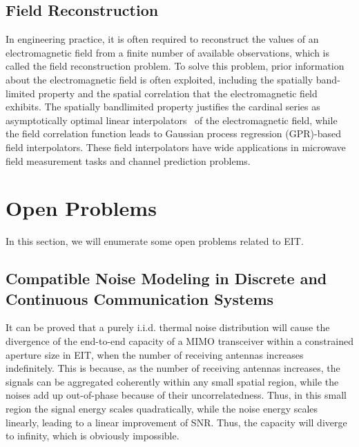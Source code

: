 \documentclass[journal,twocolumn]{IEEEtran}
\begin{document}

\subsection{Field Reconstruction}
In engineering practice, it is often required to reconstruct the values of an electromagnetic field from a finite number of available observations, which is called the field reconstruction problem. 
To solve this problem, prior information about the electromagnetic field is often exploited, including the spatially band-limited property and the spatial correlation that the electromagnetic field exhibits. 
The spatially bandlimited property justifies the cardinal series as asymptotically optimal linear interpolators~\cite{pizzo2022nyquist} of the electromagnetic field, while the field correlation function leads to Gaussian process regression (GPR)-based field interpolators. 
These field interpolators have wide applications in microwave field measurement tasks and channel prediction problems. 

\section{Open Problems}
In this section, we will enumerate some open problems related to EIT. 

\subsection{Compatible Noise Modeling in Discrete and Continuous Communication Systems}
It can be proved that a purely i.i.d. thermal noise distribution will cause the divergence of the end-to-end capacity of a MIMO transceiver within a constrained aperture size in EIT, when the number of receiving antennas increases indefinitely. 
This is because, as the number of receiving antennas increases, the signals can be aggregated coherently within any small spatial region, while the noises add up out-of-phase because of their uncorrelatedness. 
Thus, in this small region the signal energy scales quadratically, while the noise energy scales linearly, leading to a linear improvement of SNR. Thus, the capacity will diverge to infinity, which is obviously impossible.  
\end{document}
